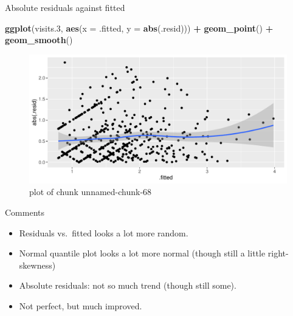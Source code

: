 \documentclass[ignorenonframetext,]{beamer}
\newenvironment{Shaded}{\begin{snugshade}}{\end{snugshade}}
\newcommand{\DataTypeTok}[1]{\textcolor[rgb]{0.13,0.29,0.53}{#1}}
\newcommand{\FloatTok}[1]{\textcolor[rgb]{0.00,0.00,0.81}{#1}}
\newcommand{\KeywordTok}[1]{\textcolor[rgb]{0.13,0.29,0.53}{\textbf{#1}}}
\newcommand{\NormalTok}[1]{#1}
\newcommand{\OperatorTok}[1]{\textcolor[rgb]{0.81,0.36,0.00}{\textbf{#1}}}
\newcommand{\StringTok}[1]{\textcolor[rgb]{0.31,0.60,0.02}{#1}}
\begin{document}
\begin{frame}[fragile]{Absolute residuals against fitted}
\protect\hypertarget{absolute-residuals-against-fitted}{}

\begin{Shaded}
\begin{Highlighting}[]
\KeywordTok{ggplot}\NormalTok{(visits}\FloatTok{.3}\NormalTok{, }\KeywordTok{aes}\NormalTok{(}\DataTypeTok{x =}\NormalTok{ .fitted, }\DataTypeTok{y =} \KeywordTok{abs}\NormalTok{(.resid))) }\OperatorTok{+}
\StringTok{  }\KeywordTok{geom_point}\NormalTok{() }\OperatorTok{+}\StringTok{ }\KeywordTok{geom_smooth}\NormalTok{()}
\end{Highlighting}
\end{Shaded}

\begin{figure}
\centering
\includegraphics{figure/unnamed-chunk-68-1.pdf}
\caption{plot of chunk unnamed-chunk-68}
\end{figure}

\end{frame}

\begin{frame}{Comments}
\protect\hypertarget{comments-7}{}

\begin{itemize}
\item
  Residuals vs.~fitted looks a lot more random.
\item
  Normal quantile plot looks a lot more normal (though still a little
  right-skewness)
\item
  Absolute residuals: not so much trend (though still some).
\item
  Not perfect, but much improved.
\end{itemize}

\end{frame}
\end{document}
